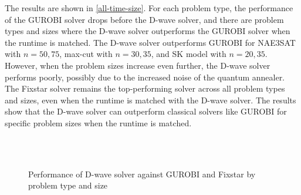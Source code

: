 The results are shown in \autoref{all-time-size}. For each problem type, the performance of the GUROBI solver drops before the D-wave solver, and there are problem types and sizes where the D-wave solver outperforms the GUROBI solver when the runtime is matched. The D-wave solver outperforms GUROBI for NAE3SAT with $n=50, 75$, max-cut with $n=30,35$, and SK model with $n=20, 35$. However, when the problem sizes increase even further, the D-wave solver performs poorly, possibly due to the increased noise of the quantum annealer. The Fixstar solver remains the top-performing solver across all problem types and sizes, even when the runtime is matched with the D-wave solver. The results show that the D-wave solver can outperform classical solvers like GUROBI for specific problem sizes when the runtime is matched.

\begin{figure}[!htbp]
    \centering
    \\
    \\    
    \caption{Performance of D-wave solver against GUROBI and Fixstar by problem type and size}
    \label{all-time-size}
\end{figure}

